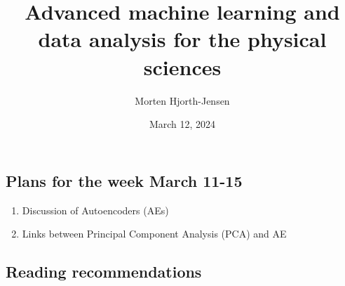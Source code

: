 \documentclass[%
oneside,                 %
final,                   %
10pt]{article}
\begin{document}

\newcommand{\exercisesection}[1]{\subsection*{#1}}






\title{Advanced machine learning and data analysis for the physical sciences}


\author{Morten Hjorth-Jensen}

\date{March 12, 2024
}

\subsection{Plans for the week March 11-15}

\begin{block}{}
\begin{enumerate}
\item Discussion of Autoencoders (AEs)

\item Links between Principal Component Analysis (PCA) and AE
\end{enumerate}

\noindent
\end{block}

\subsection{Reading recommendations}
\end{document}
